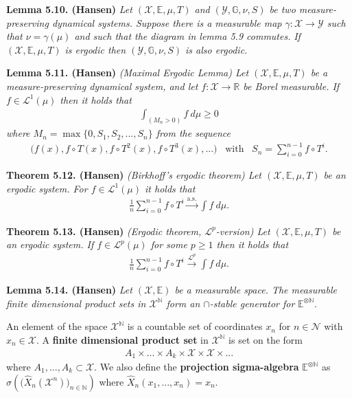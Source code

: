 \documentclass[a4paper,12pt,openany]{book}
\begin{document}
\textbf{Lemma 5.10. (Hansen)} \emph{Let \((\mathcal{X},\mathbb{E},\mu,T)\) and \((\mathcal{Y},\mathbb{G},\nu,S)\) be two measure-preserving dynamical systems. Suppose there is a measurable map \(\gamma : \mathcal{X}\to\mathcal{Y}\) such that \(\nu =\gamma(\mu)\) and such that the diagram in lemma 5.9 commutes.}
\emph{If \((\mathcal{X},\mathbb{E},\mu,T)\) is ergodic then \((\mathcal{Y},\mathbb{G},\nu,S)\) is also ergodic.}

\textbf{Lemma 5.11. (Hansen)} \emph{(Maximal Ergodic Lemma) Let \((\mathcal{X},\mathbb{E},\mu,T)\) be a measure-preserving dynamical system, and let \(f : \mathcal{X}\to \mathbb{R}\) be Borel measurable. If \(f\in \mathcal{L}^1(\mu)\) then it holds that}
\begin{align*}
    \int_{(M_n>0)}f\ d\mu\ge 0\tag{5.14}
\end{align*}
\emph{where \(M_n=\max\{0,S_1,S_2,...,S_n\}\) from the sequence}
\begin{align*}
    \Big(f(x), f\circ T(x),f\circ T^2(x),f\circ T^3(x),...\Big)\hspace{10pt}\text{with}\hspace{10pt}S_n=\sum_{i=0}^{n-1}f\circ T^i.
\end{align*}

\textbf{Theorem 5.12. (Hansen)} \emph{(Birkhoff's ergodic theorem) Let \((\mathcal{X},\mathbb{E},\mu,T)\) be an ergodic system. For \(f\in \mathcal{L}^1(\mu)\) it holds that}
\begin{align*}
    \frac{1}{n}\sum_{i=0}^{n-1}f\circ T^i\stackrel{\text{a.s.}}{\to} \int f\ d\mu.\tag{5.16}
\end{align*}

\textbf{Theorem 5.13. (Hansen)} \emph{(Ergodic theorem, \(\mathcal{L}^p\)-version) Let \((\mathcal{X},\mathbb{E},\mu,T)\) be an ergodic system. If \(f\in \mathcal{L}^p(\mu)\) for some \(p\ge 1\) then it holds that}
\begin{align*}
    \frac{1}{n}\sum_{i=0}^{n-1}f\circ T^i\stackrel{\mathcal{L}^p}{\to}\int f\ d\mu.\tag{5.21}
\end{align*}

\textbf{Lemma 5.14. (Hansen)} \emph{Let \((\mathcal{X},\mathbb{E})\) be a measurable space. The measurable finite dimensional product sets in \(\mathcal{X}^{\mathbb{N}}\) form an \(\cap\)-stable generator for} \({\mathbb{E}}^{\otimes\mathbb{N}}\).

An element of the space \(\mathcal{X}^{\mathbb{N}}\) is a countable set of coordinates \(x_n\) for \(n\in\mathcal{N}\) with \(x_n\in\mathcal{X}\). A \textbf{finite dimensional product set} in \(\mathcal{X}^{\mathbb{N}}\) is set on the form
\begin{align*}
    A_1\times ... \times A_k\times \mathcal{X}\times \mathcal{X}\times ...
\end{align*}
where \(A_1,...,A_k\subset \mathcal{X}\). We also define the \textbf{projection sigma-algebra} \(\mathbb{E}^{\otimes \mathbb{N}}\) as \(\sigma\left(\big(\hat{X}_n(\mathcal{X}^n)\big)_{n\in\mathbb{N}}\right)\) where \(\hat{X}_n(x_1,...,x_n)=x_n\).
\end{document}
